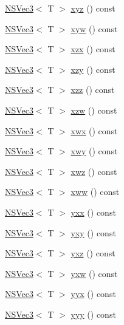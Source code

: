 \begin{DoxyCompactItemize}
\item 
\hyperlink{structNSVec3}{N\-S\-Vec3}$<$ T $>$ \hyperlink{structNSVec4_a35b541a03b7f0f95a7f746a5bd6b7195}{xyz} () const 
\item 
\hyperlink{structNSVec3}{N\-S\-Vec3}$<$ T $>$ \hyperlink{structNSVec4_ad75474b3471b73b20253fb2b6ed3d8f8}{xyw} () const 
\item 
\hyperlink{structNSVec3}{N\-S\-Vec3}$<$ T $>$ \hyperlink{structNSVec4_a231850f1da345d8bf67aa8082e58e560}{xzx} () const 
\item 
\hyperlink{structNSVec3}{N\-S\-Vec3}$<$ T $>$ \hyperlink{structNSVec4_a1b47e01fb2954ef84a2f004c74b21997}{xzy} () const 
\item 
\hyperlink{structNSVec3}{N\-S\-Vec3}$<$ T $>$ \hyperlink{structNSVec4_a57926b9426a4e9efb6aec97e886295c4}{xzz} () const 
\item 
\hyperlink{structNSVec3}{N\-S\-Vec3}$<$ T $>$ \hyperlink{structNSVec4_a51ea26ab79a63d1df7cc813137e2fb5f}{xzw} () const 
\item 
\hyperlink{structNSVec3}{N\-S\-Vec3}$<$ T $>$ \hyperlink{structNSVec4_a5c0b490de4c9c51922e461d884a17cad}{xwx} () const 
\item 
\hyperlink{structNSVec3}{N\-S\-Vec3}$<$ T $>$ \hyperlink{structNSVec4_a6359379e9563c65c849776a29964b391}{xwy} () const 
\item 
\hyperlink{structNSVec3}{N\-S\-Vec3}$<$ T $>$ \hyperlink{structNSVec4_a076fe69815d384a5e30ff51bb3247aca}{xwz} () const 
\item 
\hyperlink{structNSVec3}{N\-S\-Vec3}$<$ T $>$ \hyperlink{structNSVec4_ac0f4db57efbe701c07ad44e005d17763}{xww} () const 
\item 
\hyperlink{structNSVec3}{N\-S\-Vec3}$<$ T $>$ \hyperlink{structNSVec4_aa09453fd4136c1275c0bcb27c6ace4f2}{yxx} () const 
\item 
\hyperlink{structNSVec3}{N\-S\-Vec3}$<$ T $>$ \hyperlink{structNSVec4_ab3a30f9bb5910de736596a0543afeb18}{yxy} () const 
\item 
\hyperlink{structNSVec3}{N\-S\-Vec3}$<$ T $>$ \hyperlink{structNSVec4_a0defc1b252284ea8031668eee0840637}{yxz} () const 
\item 
\hyperlink{structNSVec3}{N\-S\-Vec3}$<$ T $>$ \hyperlink{structNSVec4_a84407cd4e0f5bad155d3f0d2eb92b380}{yxw} () const 
\item 
\hyperlink{structNSVec3}{N\-S\-Vec3}$<$ T $>$ \hyperlink{structNSVec4_a6cad319901f61420ad330ab306333f29}{yyx} () const 
\item 
\hyperlink{structNSVec3}{N\-S\-Vec3}$<$ T $>$ \hyperlink{structNSVec4_ad36e619aafdae530cd49ff4882226cff}{yyy} () const 

\end{DoxyCompactItemize}
